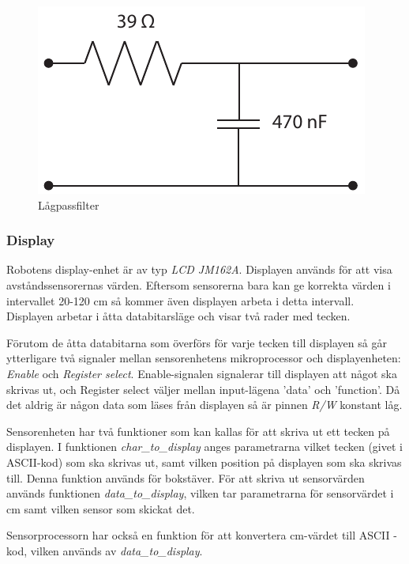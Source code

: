\begin{figure}[H]
  \centering
 \includegraphics[angle=0,scale=0.7]{bilder/LPfilter.pdf}
  \caption{Lågpassfilter}
  \label{fig:lagpassfilter}
\end{figure}



\subsubsection{Display}
Robotens display-enhet är av typ \emph{LCD JM162A}. Displayen används för att 
visa avståndssensorernas värden. Eftersom sensorerna bara kan ge korrekta 
värden i intervallet 20-120 cm så kommer även displayen arbeta i detta 
intervall. Displayen arbetar i åtta databitarsläge och visar två rader med 
tecken. 

Förutom de åtta databitarna som överförs för varje tecken till displayen så 
går ytterligare två signaler mellan sensorenhetens mikroprocessor och 
displayenheten: \emph{Enable} och \emph{Register select}. Enable-signalen 
signalerar till displayen att något ska skrivas ut, och Register select 
väljer mellan input-lägena 'data' och 'function'. Då det aldrig är någon data 
som läses från displayen så är pinnen \emph{R/W} konstant låg. 

Sensorenheten har två funktioner som kan kallas för att skriva ut ett tecken 
på displayen. I funktionen \emph{char\_to\_display} anges parametrarna vilket 
tecken (givet i ASCII-kod) som ska skrivas ut, samt vilken position på 
displayen som ska skrivas till. Denna funktion används för bokstäver. För att 
skriva ut sensorvärden används funktionen \emph{data\_to\_display}, vilken 
tar parametrarna för sensorvärdet i cm samt vilken sensor som skickat det. 

Sensorprocessorn har också en funktion för att konvertera cm-värdet till ASCII
-kod, vilken används av \emph{data\_to\_display}.

